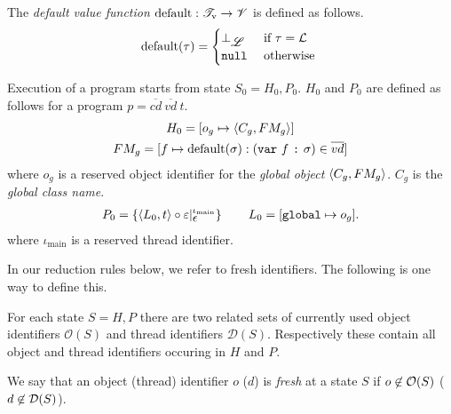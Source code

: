 \begin{definition}
  The \emph{default value function} $\mbox{$\mathrm{default}$}: \mathscr{T}_{\text{v}} \to \mathscr{V}$ is
  defined as follows.
  \begin{equation*}
    \mbox{$\mathrm{default}$}(\tau) =
    \begin{cases}
      \bot_{\mbox{$\mathscr{L}$}} & \text{ if } \tau = \mbox{$\mathcal{L}$} \\
      \mbox{\mdseries\texttt{null}}        & \text{ otherwise } 
    \end{cases}
  \end{equation*}
\end{definition}

\begin{definition} \label{def:state_zero}
  Execution of a program starts from state $S_0 = H_0, P_0$. $H_0$ and
  $P_0$ are defined as follows for a program $p =
  \overline{cd}~\overline{vd}~t$.
  \begin{equation*}
    \begin{gathered}
      H_0 = [o_g \mapsto \mbox{$\langle C_g, FM_g \rangle$}] \\
      FM_g = [f \mapsto \mbox{$\mathrm{default}$}(\sigma): (\mbox{\mdseries\texttt{var}~$f$~\texttt{:}~$\sigma$}) \in \overline{vd}]
    \end{gathered}
  \end{equation*}
  where $o_g$ is a reserved object identifier for the \emph{global object} $\mbox{$\langle C_g,
  FM_g \rangle$}$. $C_g$ is the \emph{global class name}.  
  \begin{equation*}
    \begin{gathered}
      P_0 = \left\{ \mbox{$\langle L_0, t \rangle$} \circ \varepsilon
      |_{\mbox{$\epsilon$}}^{\iota_{\text{main}}} \right\} \quad\quad
      L_0 = [ \mbox{\mdseries\texttt{global}} \mapsto o_g ].
    \end{gathered}
  \end{equation*}
  where $\iota_{\text{main}}$ is a reserved thread identifier.
\end{definition}

In our reduction rules below, we refer to fresh identifiers. The following is
one way to define this. 
\begin{definition}
  For each state $S = H, P$ there are two related sets of currently used object
  identifiers $\mathcal{O}(S)$ and thread identifiers $\mathcal{D}(S)$.
  Respectively these contain all object and thread identifiers occuring in $H$
  and $P$. 
  
  We say that an object (thread) identifier $o$ ($d$) is \emph{fresh} at a state $S$ if
  $o \not\in \mathcal{O}(S)$ ($d \not\in \mathcal{D}(S)$).
\end{definition}

